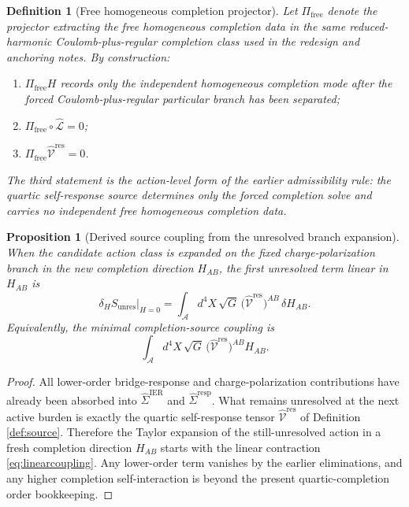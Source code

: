 \documentclass[11pt]{article}
\newcommand{\Sub}{\mathcal A}
\newcommand{\BaseLift}{\widehat\Sigma^{\mathrm{IER}}}
\newcommand{\ResponseLift}{\widehat\Sigma^{\mathrm{resp}}}
\newcommand{\ResidualLift}{\widehat{\mathcal V}^{\mathrm{res}}}
\newcommand{\SubReducedEin}{\widehat{\mathcal L}}
\newcommand{\FreeProj}{\Pi_{\mathrm{free}}}
\newtheorem{definition}{Definition}
\newtheorem{proposition}{Proposition}
\begin{document}
\begin{definition}[Free homogeneous completion projector]
\label{def:freeproj}
Let \(\FreeProj\) denote the projector extracting the \emph{free homogeneous completion data} in the same reduced-harmonic Coulomb-plus-regular completion class used in the redesign and anchoring notes. By construction:
\begin{enumerate}
    \item \(\FreeProj H\) records only the independent homogeneous completion mode after the forced Coulomb-plus-regular particular branch has been separated;
    \item \(\FreeProj\circ\SubReducedEin=0\);
    \item \(\FreeProj\ResidualLift=0\).
\end{enumerate}
The third statement is the action-level form of the earlier admissibility rule: the quartic self-response source determines only the forced completion solve and carries no independent free homogeneous completion data.
\end{definition}

\begin{proposition}[Derived source coupling from the unresolved branch expansion]
\label{prop:sourcecoupling}
When the candidate action class is expanded on the fixed charge-polarization branch in the new completion direction \(H_{AB}\), the first unresolved term linear in \(H_{AB}\) is
\begin{equation}
\delta_H S_{\mathrm{unres}}\big|_{H=0}
=
\int_{\Sub} d^4X\,\sqrt{G}\,\bigl(\ResidualLift\bigr)^{AB}\,\delta H_{AB}.
\label{eq:linearcoupling}
\end{equation}
Equivalently, the minimal completion-source coupling is
\begin{equation}
\int_{\Sub} d^4X\,\sqrt{G}\,\bigl(\ResidualLift\bigr)^{AB}H_{AB}.
\label{eq:sourceaction}
\end{equation}
\end{proposition}

\begin{proof}
All lower-order bridge-response and charge-polarization contributions have already been absorbed into \(\BaseLift\) and \(\ResponseLift\). What remains unresolved at the next active burden is exactly the quartic self-response tensor \(\ResidualLift\) of Definition \ref{def:source}. Therefore the Taylor expansion of the still-unresolved action in a fresh completion direction \(H_{AB}\) starts with the linear contraction \eqref{eq:linearcoupling}. Any lower-order term vanishes by the earlier eliminations, and any higher completion self-interaction is beyond the present quartic-completion order bookkeeping.
\end{proof}
\end{document}
